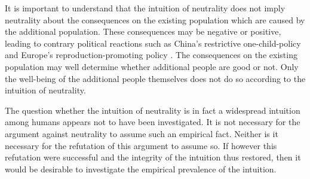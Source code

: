 It is important to understand that the intuition of neutrality does not imply neutrality about the consequences on the existing population which are caused by the additional population. These consequences may be negative or positive, leading to contrary political reactions such as China’s restrictive one-child-policy and Europe’s reproduction-promoting policy \cite[p.~169]{broome_2012}. The consequences on the existing population may well determine whether additional people are good or not. Only the well-being of the additional people themselves does not do so according to the intuition of neutrality. 

The question whether the intuition of neutrality is in fact a widespread intuition among humans appears not to have been investigated. It is not necessary for the argument against neutrality to assume such an empirical fact. Neither is it necessary for the refutation of this argument to assume so. If however this refutation were successful and the integrity of the intuition thus restored, then it would be desirable to investigate the empirical prevalence of the intuition. 